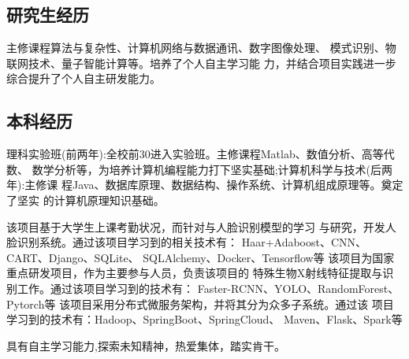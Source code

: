\documentclass[
  a4paper, 11pt
]{MyStyle}
\begin{document}
\makefrontsidebar


    \subsection{研究生经历}
    \begin{cvtable}
            {主修课程算法与复杂性、计算机网络与数据通讯、数字图像处理、
            模式识别、物联网技术、量子智能计算等。培养了个人自主学习能
            力，并结合项目实践进一步综合提升了个人自主研发能力。}
    \end{cvtable}

    \subsection{本科经历}
    \begin{cvtable}
            {理科实验班(前两年):全校前30进入实验班。主修课程Matlab、数值分析、高等代数、
            数学分析等，为培养计算机编程能力打下坚实基础;计算机科学与技术(后两年):主修课
            程Java、数据库原理、数据结构、操作系统、计算机组成原理等。奠定了坚实
            的计算机原理知识基础。}
    \end{cvtable}

    \begin{cvtable}
            {该项目基于大学生上课考勤状况，而针对与人脸识别模型的学习
            与研究，开发人脸识别系统。通过该项目学习到的相关技术有：
            Haar+Adaboost、CNN、CART、Django、SQLite、
            SQLAlchemy、Docker、Tensorflow等}
            {该项目为国家重点研发项目，作为主要参与人员，负责该项目的
            特殊生物X射线特征提取与识别工作。通过该项目学习到的技术有：
            Faster-RCNN、YOLO、RandomForest、Pytorch等}
            {该项目采用分布式微服务架构，并将其分为众多子系统。通过该
            项目学习到的技术有：Hadoop、SpringBoot、SpringCloud、
            Maven、Flask、Spark等}
    \end{cvtable}

    \begin{cvtable}
    \end{cvtable}

    {具有自主学习能力,探索未知精神，热爱集体，踏实肯干。}
\end{document}
